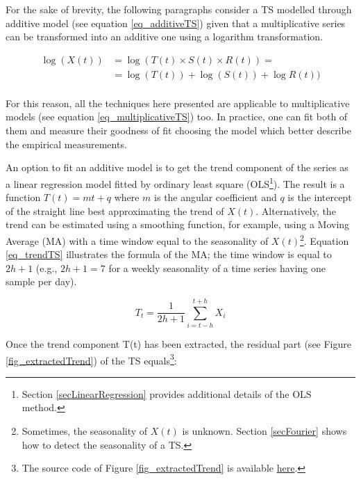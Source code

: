 For the sake of brevity, the following paragraphs consider a TS modelled through additive model (see equation \ref{eq_additiveTS}) given that a multiplicative series can be transformed into an additive one using a logarithm transformation.

\begin{equation}
\begin{split}
    \log{\left(X\left(t\right)\right)} & =\log{\left(T\left(t\right)\times S\left(t\right)\times R\left(t\right)\right)}=\\
    & =\log{(T(t))+\log{(S(t))+\log{R(t))}}}\\
\end{split}
\label{eq_additiveMultiplicativeTransform}
\end{equation}

For this reason, all the techniques here presented are applicable to multiplicative models (see equation \ref{eq_multiplicativeTS}) too. In practice, one can fit both of them and measure their goodness of fit choosing the model which better describe the empirical measurements. 

An option to fit an additive model is to get the trend component of the series as a linear regression model fitted by ordinary least square (OLS\footnote{Section \ref{secLinearRegression} provides additional details of the OLS method.}). The result is a function $T\left(t\right)=mt+q$ where $m$ is the angular coefficient and $q$ is the intercept of the straight line best approximating the trend of $X(t)$. Alternatively, the trend can be estimated using a smoothing function, for example, using a Moving Average (MA) with a time window equal to the seasonality of $X(t)$\footnote{Sometimes, the seasonality of $X(t)$ is unknown. Section \ref{secFourier} shows how to detect the seasonality of a TS.}. Equation \ref{eq_trendTS} illustrates the formula of the MA; the time window is equal to $2h+1$ (e.g., $2h+1=7$ for a weekly seasonality of a time series having one sample per day).

\begin{equation}
T_t=\frac{1}{2h+1}\sum_{i=t-h}^{t+h}X_i
\label{eq_trendTS}
\end{equation}

Once the trend component T(t) has been extracted, the residual part (see Figure \ref{fig_extractedTrend})  of the TS equals\footnote{The source code of Figure \ref{fig_extractedTrend} is available \href{https://github.com/aletuf93/logproj/blob/master/examples/03.\%20Statistics.ipynb}{here}.}: 

